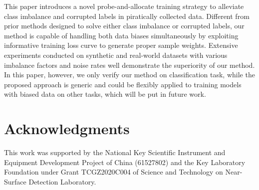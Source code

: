 \documentclass[letterpaper]{article} %
\begin{document}
This paper introduces a novel probe-and-allocate training strategy to alleviate class imbalance and corrupted labels in piratically collected data.
Different from prior methods designed to solve either class imbalance or corrupted labels, our method is capable of handling both data biases simultaneously by exploiting informative training loss curve to generate proper sample weights.
Extensive experiments conducted on synthetic and real-world datasets with various imbalance factors and noise rates well demonstrate the superiority of our method.
In this paper, however, we only verify our method on classification task, while the proposed approach is generic and could be flexibly applied to training models with biased data on other tasks, which  will be put in future work.

\section{Acknowledgments}
This work was supported by the National Key Scientific Instrument and Equipment Development Project of China (61527802) and  the Key Laboratory Foundation under Grant TCGZ2020C004 of Science and Technology on Near-Surface Detection Laboratory.
\end{document}
